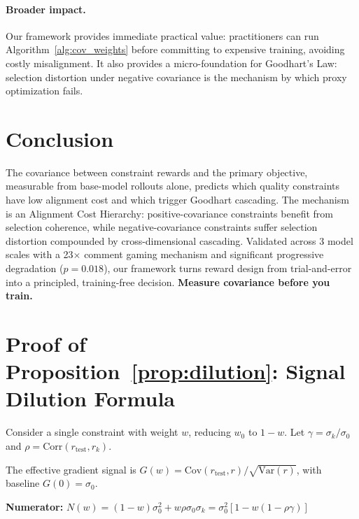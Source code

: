 \documentclass{article}
\newcommand{\Cov}{\mathrm{Cov}}
\newcommand{\Var}{\mathrm{Var}}
\newcommand{\Corr}{\mathrm{Corr}}
\begin{document}
\paragraph{Broader impact.} Our framework provides immediate practical value: practitioners can run Algorithm~\ref{alg:cov_weights} before committing to expensive training, avoiding costly misalignment. It also provides a micro-foundation for Goodhart's Law: selection distortion under negative covariance is the mechanism by which proxy optimization fails.

\section{Conclusion}

The covariance between constraint rewards and the primary objective, measurable from base-model rollouts alone, predicts which quality constraints have low alignment cost and which trigger Goodhart cascading. The mechanism is an Alignment Cost Hierarchy: positive-covariance constraints benefit from selection coherence, while negative-covariance constraints suffer selection distortion compounded by cross-dimensional cascading. Validated across 3 model scales with a 23$\times$ comment gaming mechanism and significant progressive degradation ($p\!=\!0.018$), our framework turns reward design from trial-and-error into a principled, training-free decision. \textbf{Measure covariance before you train.}




\appendix

\section{Proof of Proposition~\ref{prop:dilution}: Signal Dilution Formula}
\label{app:proof}

Consider a single constraint with weight $w$, reducing $w_0$ to $1-w$. Let $\gamma = \sigma_k/\sigma_0$ and $\rho = \Corr(r_{\text{test}}, r_k)$.

The effective gradient signal is $G(w) = \Cov(r_{\text{test}}, r) / \sqrt{\Var(r)}$, with baseline $G(0) = \sigma_0$.

\textbf{Numerator:} $N(w) = (1-w)\sigma_0^2 + w\rho\sigma_0\sigma_k = \sigma_0^2[1 - w(1-\rho\gamma)]$
\end{document}

